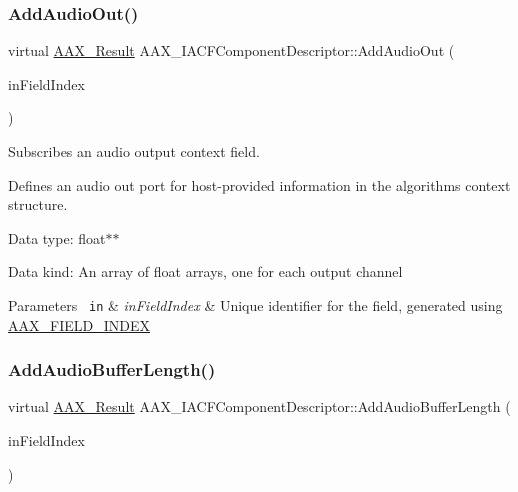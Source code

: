 \subsubsection{\texorpdfstring{AddAudioOut()}{AddAudioOut()}}
{\footnotesize\ttfamily virtual \mbox{\hyperlink{a00392_a4d8f69a697df7f70c3a8e9b8ee130d2f}{A\+A\+X\+\_\+\+Result}} A\+A\+X\+\_\+\+I\+A\+C\+F\+Component\+Descriptor\+::\+Add\+Audio\+Out (\begin{DoxyParamCaption}\item[{\mbox{\hyperlink{a00392_ae807f8986143820cfb5d6da32165c9c7}{A\+A\+X\+\_\+\+C\+Field\+Index}}}]{in\+Field\+Index }\end{DoxyParamCaption})\hspace{0.3cm}{\ttfamily [pure virtual]}}



Subscribes an audio output context field. 

Defines an audio out port for host-\/provided information in the algorithm\textquotesingle{}s context structure.


\begin{DoxyItemize}
\item Data type\+: float$\ast$$\ast$
\item Data kind\+: An array of float arrays, one for each output channel
\end{DoxyItemize}


\begin{DoxyParams}[1]{Parameters}
\mbox{\texttt{ in}}  & {\em in\+Field\+Index} & Unique identifier for the field, generated using \mbox{\hyperlink{a00392_acf807247ecd6e5899dc9dc31644e9a1d}{A\+A\+X\+\_\+\+F\+I\+E\+L\+D\+\_\+\+I\+N\+D\+EX}} \\
\hline
\end{DoxyParams}
\mbox{\label{a01625_a38c2683ca133ca0863e4645afd27ab9f}} 
\subsubsection{\texorpdfstring{AddAudioBufferLength()}{AddAudioBufferLength()}}
{\footnotesize\ttfamily virtual \mbox{\hyperlink{a00392_a4d8f69a697df7f70c3a8e9b8ee130d2f}{A\+A\+X\+\_\+\+Result}} A\+A\+X\+\_\+\+I\+A\+C\+F\+Component\+Descriptor\+::\+Add\+Audio\+Buffer\+Length (\begin{DoxyParamCaption}\item[{\mbox{\hyperlink{a00392_ae807f8986143820cfb5d6da32165c9c7}{A\+A\+X\+\_\+\+C\+Field\+Index}}}]{in\+Field\+Index }\end{DoxyParamCaption})\hspace{0.3cm}{\ttfamily [pure virtual]}}



